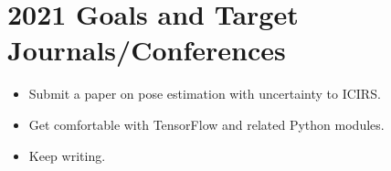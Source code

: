 \documentclass[11pt]{article}
\begin{document}
\section{2021 Goals and Target Journals/Conferences}
\begin{itemize}
      \item Submit a paper on pose estimation with uncertainty to ICIRS.
      \item Get comfortable with TensorFlow and related Python modules.
      \item Keep writing.
\end{itemize}


\newpage


\end{document}
